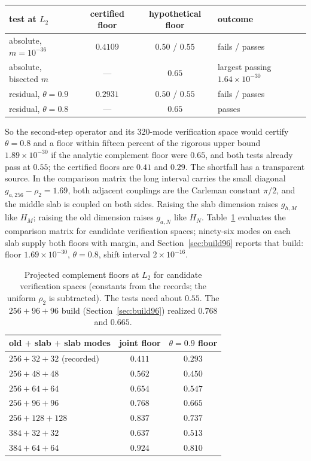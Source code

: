 \documentclass[11pt]{article}
\numberwithin{equation}{section}
\theoremstyle{definition}
\theoremstyle{remark}
\newcommand{\Ltwo}{L_2}
\newcommand{\UpperLtwo}{1.89\times10^{-30}}                 %
\newcommand{\FloorTwo}{1.69\times10^{-30}}          %
\newcommand{\ThetaTwo}{0.8}                         %
\newcommand{\ShiftTwo}{2\times10^{-16}}             %
\begin{document}
\begin{center}\small
\begin{tabular}{@{}lccl@{}}\toprule
test at $\Ltwo$ & certified floor & hypothetical floor & outcome\\\midrule
absolute, $m=10^{-36}$ & $0.4109$ & $0.50$ / $0.55$ & fails / passes\\
absolute, bisected $m$ & --- & $0.65$ & largest passing $1.64\times10^{-30}$\\
residual, $\theta=0.9$ & $0.2931$ & $0.50$ / $0.55$ & fails / passes\\
residual, $\theta=0.8$ & --- & $0.65$ & passes\\\bottomrule
\end{tabular}
\end{center}
So the second-step operator and its 320-mode verification space would certify $\theta=0.8$ and a floor within fifteen percent of the rigorous upper bound $\UpperLtwo$ if the analytic complement floor were $0.65$, and both tests already pass at $0.55$; the certified floors are $0.41$ and $0.29$. The shortfall has a transparent source. In the comparison matrix the long interval carries the small diagonal $g_{a,256}-\rho_2=1.69$, both adjacent couplings are the Carleman constant $\pi/2$, and the middle slab is coupled on both sides. Raising the slab dimension raises $g_{h,M}$ like $H_M$; raising the old dimension raises $g_{a,N}$ like $H_N$. Table~\ref{tab:projection} evaluates the comparison matrix for candidate verification spaces; ninety-six modes on each slab supply both floors with margin, and Section~\ref{sec:build96} reports that build: floor $\FloorTwo$, $\theta=\ThetaTwo$, shift interval $\ShiftTwo$.

\begin{table}[t]\centering\small
\caption{Projected complement floors at $\Ltwo$ for candidate verification spaces (constants from the records; the uniform $\rho_2$ is subtracted). The tests need about $0.55$. The $256+96+96$ build (Section~\ref{sec:build96}) realized $0.768$ and $0.665$.}\label{tab:projection}
\begin{tabular}{@{}lcc@{}}\toprule
old $+$ slab $+$ slab modes & joint floor & $\theta=0.9$ floor\\\midrule
$256+32+32$ (recorded) & $0.411$ & $0.293$\\
$256+48+48$ & $0.562$ & $0.450$\\
$256+64+64$ & $0.654$ & $0.547$\\
$256+96+96$ & $0.768$ & $0.665$\\
$256+128+128$ & $0.837$ & $0.737$\\
$384+32+32$ & $0.637$ & $0.513$\\
$384+64+64$ & $0.924$ & $0.810$\\\bottomrule
\end{tabular}
\end{table}
\end{document}
